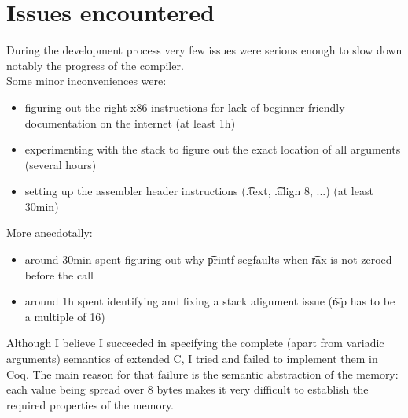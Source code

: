 \section{Issues encountered}

During the development process very few issues were serious enough to slow down notably the progress of the compiler.\\
Some minor inconveniences were:
\begin{itemize}
    \item figuring out the right x86 instructions for lack of beginner-friendly documentation on the internet (at least 1h)
    \item experimenting with the stack to figure out the exact location of all arguments (several hours)
    \item setting up the assembler header instructions (\t{.text}, \t{.align 8}, ...) (at least 30min)
\end{itemize}

More anecdotally:
\begin{itemize}
    \item around 30min spent figuring out why \t{printf} segfaults when \t{rax} is not zeroed before the call
    \item around 1h spent identifying and fixing a stack alignment issue (\t{rsp} has to be a multiple of 16)
\end{itemize}

Although I believe I succeeded in specifying the complete (apart from variadic arguments) semantics of extended C\textminus\textminus, I tried and failed to implement them in Coq. The main reason for that failure is the semantic abstraction of the memory: each value being spread over 8 bytes makes it very difficult to establish the required properties of the memory.
